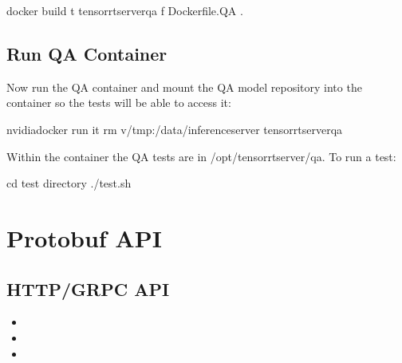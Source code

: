 \documentclass[letterpaper,10pt,english]{sphinxmanual}
\begin{document}
\begin{sphinxVerbatim}[commandchars=\\\{\}]
\PYGZdl{} docker build \PYGZhy{}t tensorrtserver\PYGZus{}qa \PYGZhy{}f Dockerfile.QA .
\end{sphinxVerbatim}


\section{Run QA Container}
\label{\detokenize{test:run-qa-container}}
Now run the QA container and mount the QA model repository into the
container so the tests will be able to access it:

\begin{sphinxVerbatim}[commandchars=\\\{\}]
\PYGZdl{} nvidia\PYGZhy{}docker run \PYGZhy{}it \PYGZhy{}\PYGZhy{}rm \PYGZhy{}v/tmp:/data/inferenceserver tensorrtserver\PYGZus{}qa
\end{sphinxVerbatim}

Within the container the QA tests are in /opt/tensorrtserver/qa. To run a test:

\begin{sphinxVerbatim}[commandchars=\\\{\}]
\PYGZdl{} cd \PYGZlt{}test directory\PYGZgt{}
\PYGZdl{} ./test.sh
\end{sphinxVerbatim}


\chapter{Protobuf API}
\label{\detokenize{protobuf_api/protobuf_api_root:protobuf-api}}\label{\detokenize{protobuf_api/protobuf_api_root::doc}}

\section{HTTP/GRPC API}
\label{\detokenize{protobuf_api/protobuf_api_root:http-grpc-api}}\begin{itemize}
\item {} 

\item {} 

\item {} 

\end{itemize}
\end{document}
